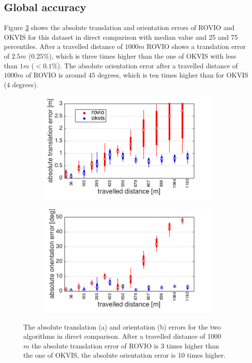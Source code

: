 \subsection{Global accuracy}
\label{sec:ijrr_global}

Figure \ref{pics:ijrr_abs} shows the absolute translation and orientation errors of ROVIO and OKVIS for this dataset in direct comparison with median value and 25 and 75 percentiles. After a travelled distance of $1000 m$ ROVIO shows a translation error of $2.5 m$ ($0.25\%$), which is three times higher than the one of OKVIS with less than $1 m$ ($<0.1\%$). The absolute orientation error after a travelled distance of $1000 m$ of ROVIO is around $45$ degrees, which is ten times higher than for OKVIS ($4$ degrees). 

\begin{figure}[h]
  \begin{subfigure}[b]{0.48\textwidth}
    \includegraphics[width=\textwidth]{images/ijrr/ate.png}
    \caption{}
    \label{fig:2}
  \end{subfigure}
  \hfill
  \begin{subfigure}[b]{0.48\textwidth}
    \includegraphics[width=\textwidth]{images/ijrr/aoe.png}
    \caption{}
    \label{fig:2}
  \end{subfigure}
   \caption{The absolute translation (a) and orientation (b) errors for the two algorithms in direct comparison. After a travelled distance of 1000 $m$ the absolute translation error of ROVIO is 3 times higher than the one of OKVIS, the absolute orientation error is 10 times higher.}
   \label{pics:ijrr_abs}
\end{figure}

